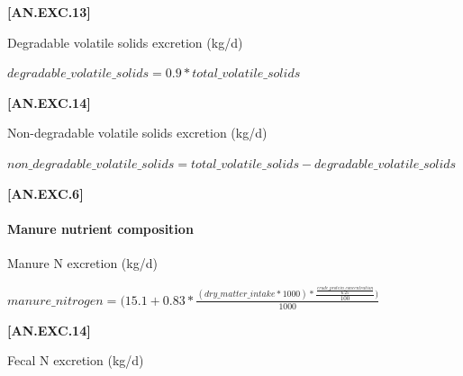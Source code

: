 \documentclass{article}
\begin{document}
\begin{refsection}
\begin{itemize}
            {\raggedleft \textbf{[AN.EXC.13]}\par}
            \vspace{0.5cm} 

Degradable volatile solids excretion (kg/d)
        \vspace{0.5cm}
    
    \begin{center}
        \(degradable\_volatile\_solids=0.9 * total\_volatile\_solids\)
    \end{center}
        \vspace{0.5cm} 
    
            {\raggedleft \textbf{[AN.EXC.14]}\par}
            \vspace{0.5cm} 

Non-degradable volatile solids excretion (kg/d)
        \vspace{0.5cm}
    
    \begin{center}
        \(non\_degradable\_volatile\_solids = total\_volatile\_solids - degradable\_volatile\_solids\)
    \end{center}
        \vspace{0.5cm} 
    
            {\raggedleft \textbf{[AN.EXC.6]}\par}
            \vspace{0.5cm} 

\paragraph{Manure nutrient composition}
\vspace{-0.25cm}

Manure N excretion (kg/d)
        \vspace{0.5cm}
    
    \begin{center}
        \(manure\_nitrogen=(15.1+0.83 * \frac{(dry\_matter\_intake * 1000) * \frac{\frac{crude\_protein\_concentration}{6.25}}{100})}{1000}\)
    \end{center}
        \vspace{0.5cm} 
    
            {\raggedleft \textbf{[AN.EXC.14]}\par}
            \vspace{0.5cm} 

Fecal N excretion (kg/d)
        \vspace{0.5cm}
    

\end{itemize}
\end{refsection}
\end{document}
